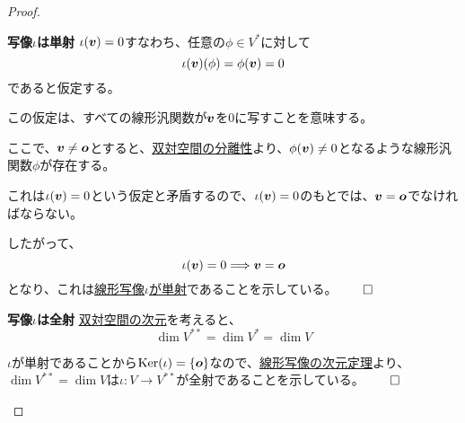 \documentclass[../../../topic_linear-algebra]{subfiles}
\begin{document}
\begin{proof}
  \begin{subpattern}{\bfseries 写像$\iota$は単射}
    $\iota(\vb*{v}) = 0$すなわち、任意の$\phi \in V^*$に対して
    \begin{equation*}
      \iota(\vb*{v})(\phi) = \phi(\vb*{v}) = 0
    \end{equation*}
    であると仮定する。
    
    この仮定は、すべての線形汎関数が$\vb*{v}$を0に写すことを意味する。
    
    \br
    
    ここで、$\vb*{v} \neq \vb*{o}$とすると、\hyperref[thm:dual-space-separation]{双対空間の分離性}より、$\phi(\vb*{v}) \neq 0$となるような線形汎関数$\phi$が存在する。

    これは$\iota(\vb*{v}) = 0$という仮定と矛盾するので、$\iota(\vb*{v}) = 0$のもとでは、$\vb*{v} = \vb*{o}$でなければならない。
    
    \br
    
    したがって、
    \begin{equation*}
      \iota(\vb*{v}) = 0 \Longrightarrow \vb*{v} = \vb*{o}
    \end{equation*}
    となり、これは\hyperref[thm:injective-zero-test]{線形写像$\iota$が単射}であることを示している。$\qed$
  \end{subpattern}
  
  \begin{subpattern}{\bfseries 写像$\iota$は全射}
    \hyperref[thm:dual-basis-dimension]{双対空間の次元}を考えると、
    \begin{equation*}
      \dim V^{**} = \dim V^* = \dim V
    \end{equation*}
    
    
    $\iota$が単射であることから$\operatorname{Ker}(\iota) = \{ \vb*{o} \}$なので、\hyperref[thm:rank-nullity-theorem]{線形写像の次元定理}より、$\dim V^{**} = \dim V$は$\iota \colon V \to V^{**}$が全射であることを示している。$\qed$
  \end{subpattern}
\end{proof}
\end{document}
